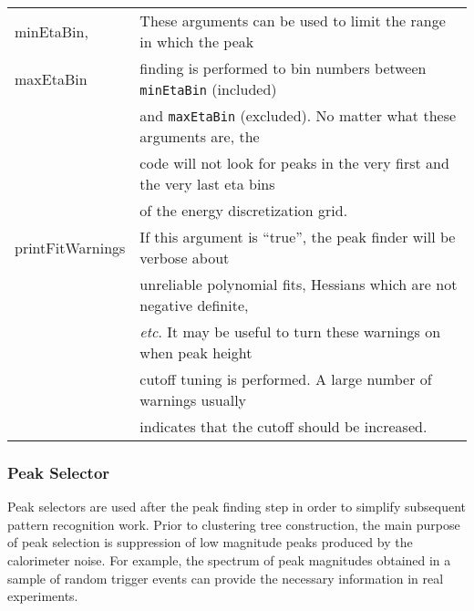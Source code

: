 \documentclass[epsf,12pt,titlepage]{article}
\begin{document}
\noindent \begin{tabular}{ll}
minEtaBin, & These arguments can be used to limit the range in which the peak\\
maxEtaBin &  finding is performed to bin numbers between \verb]minEtaBin] (included)\\
& and \verb]maxEtaBin] (excluded). No matter what these arguments are, the\\
& code will not look for peaks in the very first and the very last eta bins\\
& of the energy discretization grid.\\
printFitWarnings & If this argument is ``true'', the peak finder will be verbose about\\
& unreliable polynomial fits, Hessians which are not negative definite,\\
& {\it etc}. It may be useful to turn these warnings on when peak height\\
& cutoff tuning is performed. A large number of warnings usually\\
& indicates that the cutoff should be increased.
\end{tabular}

\vskip2mm
\noindent


\subsubsection{Peak Selector}

Peak selectors are used after the peak finding step in order to
simplify subsequent pattern recognition work. Prior to clustering
tree construction, the main purpose of peak
selection is suppression of low magnitude peaks produced by the
calorimeter noise. For example, the spectrum of peak magnitudes
obtained in a sample of random trigger events can provide the necessary
information in real experiments.
\end{document}
